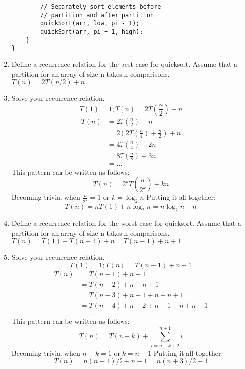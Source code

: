 \documentclass[11pt]{article}
\begin{document}
\begin{enumerate}
\begin{verbatim}
        // Separately sort elements before 
        // partition and after partition 
        quickSort(arr, low, pi - 1); 
        quickSort(arr, pi + 1, high); 
    } 
}
        \end{verbatim}
        \item Define a recurrence relation for the best case for quicksort. Assume that a partition for an array of size n takes n comparisons.\\
        $T(n) = 2T(n/2) + n$
        \item Solve your recurrence relation.
        $$T(1) = 1; T(n) = 2T(\frac{n}{2}) + n$$
            \begin{equation}
                \begin{split}
                    T(n) & = 2T(\frac{n}{2}) + n \\
                         & = 2(2T(\frac{n}{4}) + \frac{n}{2}) + n \\
                         & = 4T(\frac{n}{4}) + 2n \\
                         & = 8T(\frac{n}{8}) + 3n \\
                         & = \ldots
                \end{split}
            \end{equation}
            This pattern can be written as follows: $$T(n) = 2^kT(\frac{n}{2^k}) + kn$$
            Becoming trivial when $\frac{n}{2^k} = 1$ or $k = \log_{2}n$
            Putting it all together: $$T(n) = nT(1) + n \log_{2}n = n \log_{2}n + n$$
        \item Define a recurrence relation for the worst case for quicksort. Assume that a partition for an array of size n takes n comparisons.\\
        $T(n) = T(1) + T(n - 1) + n = T(n - 1) + n + 1$
        \item Solve your recurrence relation.
        $$T(1) = 1; T(n) = T(n - 1) + n + 1$$
            \begin{equation}
                \begin{split}
                    T(n) & = T(n - 1) + n + 1 \\
                         & = T(n - 2) + n + n + 1 \\
                         & = T(n - 3) + n - 1 + n + n + 1 \\
                         & = T(n - 4) + n - 2 + n - 1 + n + n + 1 \\
                         & = \ldots
                \end{split}
            \end{equation}
            This pattern can be written as follows: $$T(n) = T(n - k) + \sum\limits_{i = n - k + 2}^{n + 1}i$$
            Becoming trivial when $n - k = 1$ or $k = n - 1$
            Putting it all together: $$T(n) = n(n + 1)/2 + n - 1 = n(n + 3)/2 - 1$$
    \end{enumerate}
    \label{r:lastpage}
    
\end{document}
